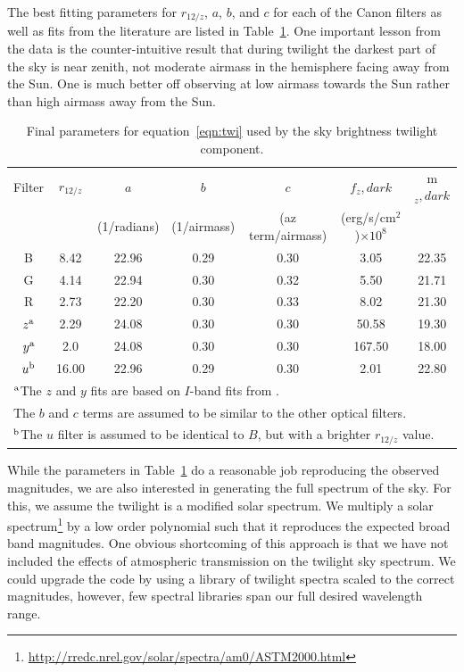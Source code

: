 \documentclass[]{spie}
\begin{document}
The best fitting parameters for $r_{12/z}$, $a$, $b$, and $c$ for each of the Canon filters as well as fits from the literature are listed in Table~\ref{table:canonFits}.  One important lesson from the data is the counter-intuitive result that during twilight the darkest part of the sky is near zenith, not moderate airmass in the hemisphere facing away from the Sun. One is much better off observing at low airmass towards the Sun rather than high airmass away from the Sun.

\begin{table}
\caption{Final parameters for equation~\ref{eqn:twi} used by the sky brightness twilight component. 
\label{table:canonFits}}
\begin{center}
\begin{tabular}{c c c c c c c}
  Filter & $r_{12/z}$ & $a$  & $b$  & $c$  & $f_z,dark$ & m$_z,dark$ \\
  & & (1/radians) & (1/airmass) & (az term/airmass) & (erg/s/cm$^2$)$\times 10^8$ \\
  \hline
  \hline
  B  & 8.42 & 22.96 & 0.29 & 0.30 & 3.05  &  22.35 \\
  G  & 4.14 & 22.94 & 0.30 & 0.32 & 5.50  &  21.71 \\
  R  & 2.73 & 22.20 & 0.30 & 0.33 & 8.02  &  21.30 \\
  $z^{\rm{a}}$ & 2.29 & 24.08 & 0.30 & 0.30 & 50.58  &  19.30 \\
  $y^{\rm{a}}$  & 2.0 & 24.08 & 0.30 & 0.30 & 167.50  &  18.00 \\
  $u^{\rm{b}}$  & 16.00 & 22.96 & 0.29 & 0.30 & 2.01  &  22.80\\
 \hline
 \multicolumn{7}{l}{$^{\rm{a}}$The $z$ and $y$ fits are based on $I$-band fits from \cite{Patat06}.} \\
 \multicolumn{7}{l}{The $b$ and $c$ terms are assumed to be similar to the other optical filters.} \\
 \multicolumn{7}{l}{$^{\rm{b}}$The $u$ filter is assumed to be identical to $B$, but with a brighter $r_{12/z}$ value.}
 \end{tabular}
 \end{center}
\end{table}


While the parameters in Table~\ref{table:canonFits} do a reasonable job reproducing the observed magnitudes, we are also interested in generating the full spectrum of the sky.  For this, we assume the twilight is a modified solar spectrum.  We multiply a solar spectrum\footnote{\url{http://rredc.nrel.gov/solar/spectra/am0/ASTM2000.html}} by a low order polynomial such that it reproduces the expected broad band magnitudes.  One obvious shortcoming of this approach is that we have not included the effects of atmospheric transmission on the twilight sky spectrum. We could upgrade the code by using a library of twilight spectra scaled to the correct magnitudes, however, few spectral libraries span our full desired wavelength range.
\end{document}
